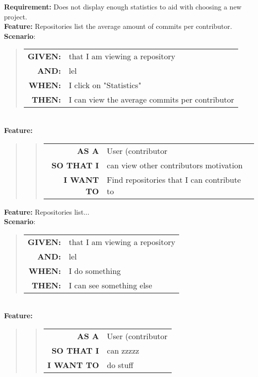 \documentclass[12pt]{article}
\newcommand{\Requirement}[1] {
   \noindent \textbf{Requirement:} #1
}
\newcommand{\Feature}[1]{ 
   \noindent \textbf{Feature:} #1
}
\newcommand{\FeatureC}[4]{ 
	\begin{quote}
	\begin{tabular}{rl}
	\textbf{AS A} & #1\\
	\textbf{SO THAT \uppercase{#2}} & #3\\
	\textbf{\uppercase{#2} WANT TO} & #4  
	\end{tabular}
	\end{quote}
}
\newcommand{\GivenSc} {
	\noindent \textbf{GIVEN:}
	}
\newcommand{\WhenSc} {
	\noindent \textbf{WHEN:}
	}
\newcommand{\AndSc} {
	\noindent \textbf{AND:}
	}
\newcommand{\ThenSc} {
	\noindent \textbf{THEN:}
	}
\begin{document}
\begin{framed}
\Requirement{Does not display enough statistics to aid with choosing a new project.}\\[0.2cm]
\Feature{Repositories list the average amount of commits per contributor.}\\[0.4cm]
\noindent \textbf{Scenario}:
\begin{quote}
\begin{tabular}{rl}
\GivenSc & that I am viewing a repository\\
\AndSc & lel\\
\WhenSc & I click on "Statistics"\\
\ThenSc & I can view the average commits per contributor
\end{tabular}
\end{quote}
~\\
\Feature{}
\begin{quote}
\FeatureC{User (contributor}{I}{can view other contributors motivation}{Find repositories that I can contribute to}
\end{quote}

\Feature{Repositories list...}\\[0.4cm]
\noindent \textbf{Scenario}:
\begin{quote}
\begin{tabular}{rl}
\GivenSc & that I am viewing a repository\\
\AndSc & lel\\
\WhenSc & I do something\\
\ThenSc & I can see something else
\end{tabular}
\end{quote}
~\\
\Feature{}
\begin{quote}
\FeatureC{User (contributor}{I}{can zzzzz}{do stuff}
\end{quote}
\
\end{framed}
\end{document}
